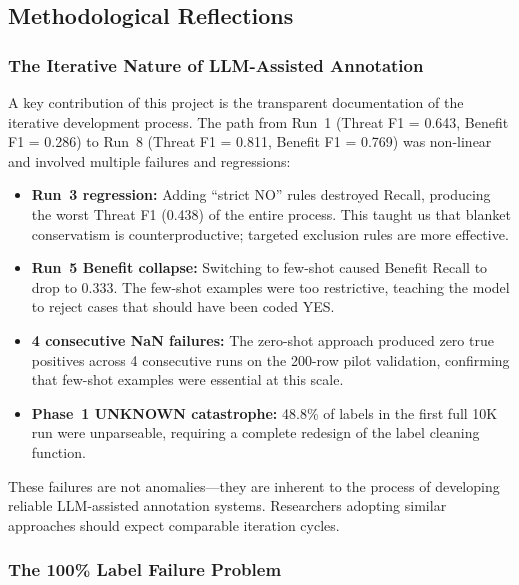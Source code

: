 \subsection{Methodological Reflections}

\subsubsection{The Iterative Nature of LLM-Assisted Annotation}

A key contribution of this project is the transparent documentation of the iterative development process. The path from Run~1 (Threat F1 = 0.643, Benefit F1 = 0.286) to Run~8 (Threat F1 = 0.811, Benefit F1 = 0.769) was non-linear and involved multiple failures and regressions:

\begin{itemize}
    \item \textbf{Run~3 regression:} Adding ``strict NO'' rules destroyed Recall, producing the worst Threat F1 (0.438) of the entire process. This taught us that blanket conservatism is counterproductive; targeted exclusion rules are more effective.
    
    \item \textbf{Run~5 Benefit collapse:} Switching to few-shot caused Benefit Recall to drop to 0.333. The few-shot examples were too restrictive, teaching the model to reject cases that should have been coded YES.
    
    \item \textbf{4 consecutive NaN failures:} The zero-shot approach produced zero true positives across 4 consecutive runs on the 200-row pilot validation, confirming that few-shot examples were essential at this scale.
    
    \item \textbf{Phase~1 UNKNOWN catastrophe:} 48.8\% of labels in the first full 10K run were unparseable, requiring a complete redesign of the label cleaning function.
\end{itemize}

These failures are not anomalies---they are inherent to the process of developing reliable LLM-assisted annotation systems. Researchers adopting similar approaches should expect comparable iteration cycles.

\subsubsection{The 100\% Label Failure Problem}

